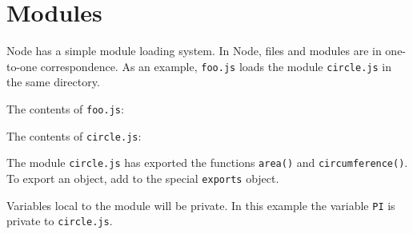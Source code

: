 \section{Modules}

\begin{Shaded}
\begin{Highlighting}[]
\NormalTok{: } 
\end{Highlighting}
\end{Shaded}

Node has a simple module loading system. In Node, files and modules are
in one-to-one correspondence. As an example, \texttt{foo.js} loads the
module \texttt{circle.js} in the same directory.

The contents of \texttt{foo.js}:

\begin{Shaded}
\begin{Highlighting}[]
 \NormalTok{);}
\NormalTok{( }
           \NormalTok{+ }\NormalTok{(}\NormalTok{));}
\end{Highlighting}
\end{Shaded}

The contents of \texttt{circle.js}:

\begin{Shaded}
\begin{Highlighting}[]
  \NormalTok{= }\NormalTok{;}

 \NormalTok{= } 
    
\NormalTok{\};}

 \NormalTok{= } 
    \NormalTok{* } 
\NormalTok{\};}
\end{Highlighting}
\end{Shaded}

The module \texttt{circle.js} has exported the functions \texttt{area()}
and \texttt{circumference()}. To export an object, add to the special
\texttt{exports} object.

Variables local to the module will be private. In this example the
variable \texttt{PI} is private to \texttt{circle.js}.

